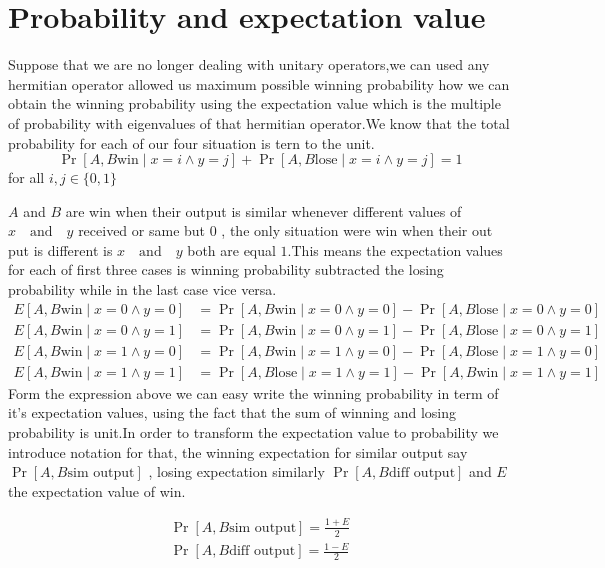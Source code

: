 \section*{Probability  and expectation value}
Suppose that we are no longer dealing with unitary operators,we can used any hermitian operator allowed us maximum possible winning probability how we can obtain the winning probability using the expectation value which is the multiple of probability with  eigenvalues of that  hermitian operator.We know that the total probability for each of our four situation is tern to the unit.
$$\Pr[A,B \text{win} \mid  x=i \wedge y=j]+\Pr[A,B \text{lose}  \mid  x=i \wedge y=j]=1$$ for all $i,j \in \{0,1\}$


$A$ and $B$ are win when their output is similar whenever  different values of $x \quad \text{and} \quad y$ received or same but $0$ , the only situation were win when their out put is different is $x \quad \text{and} \quad y$ both are equal $1$.This means the expectation values for  each of first three  cases is   winning probability subtracted  the losing probability while in the last case vice versa.
\begin{align*}
E[A,B \text{win}  \mid  x=0 \wedge y=0]&=\Pr[A,B \text{win}  \mid  x=0 \wedge y=0]-\Pr[A,B \text{lose}  \mid  x=0 \wedge y=0]\\
E[A,B \text{win}  \mid  x=0 \wedge y=1]&=\Pr[A,B \text{win}  \mid  x=0 \wedge y=1]-\Pr[A,B \text{lose}  \mid  x=0 \wedge y=1]\\
E[A,B \text{win}  \mid  x=1 \wedge y=0]&=\Pr[A,B \text{win}  \mid  x=1 \wedge y=0]-\Pr[A,B \text{lose}  \mid  x=1 \wedge y=0]\\
E[A,B \text{win}  \mid  x=1 \wedge y=1]&=\Pr[A,B \text{lose}  \mid  x=1 \wedge y=1]-\Pr[A,B \text{win}  \mid  x=1 \wedge y=1]
\end{align*}
Form the expression above we can easy write the winning probability in term of it's expectation values, using the fact that the sum of winning and losing probability  is unit.In order to transform the expectation value to probability we introduce notation for that, the winning expectation for similar output say $\Pr[A,B \text{sim output}]$ , losing expectation similarly $\Pr[A,B \text{diff output}]$ and $E$the expectation value of win.

\begin{align*}
\Pr[A,B \text{sim output}]=\frac{1+E}{2}\\
\Pr[A,B \text{diff output}]=\frac{1-E}{2}
\end{align*}


